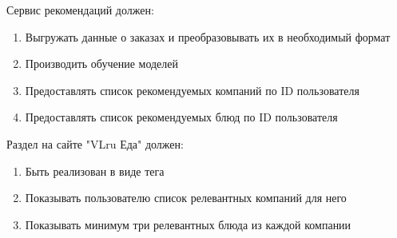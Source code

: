 Сервис рекомендаций должен:
\begin{enumerate}
  \item Выгружать данные о заказах и преобразовывать их в необходимый формат
  \item Производить обучение моделей
  \item Предоставлять список рекомендуемых компаний по ID пользователя
  \item Предоставлять список рекомендуемых блюд по ID пользователя
\end{enumerate}

Раздел на сайте "VLru Еда" должен:
\begin{enumerate}
  \item Быть реализован в виде тега
  \item Показывать пользователю список релевантных компаний для него
  \item Показывать минимум три релевантных блюда из каждой компании
\end{enumerate}
